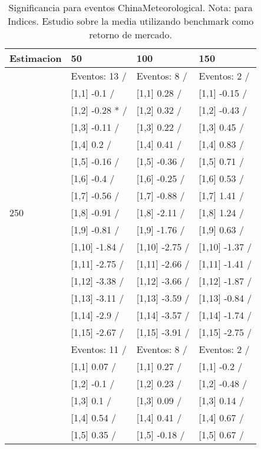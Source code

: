 \begin{table}

\caption{Significancia para eventos ChinaMeteorological. Nota: para Indices. Estudio sobre la media utilizando benchmark como retorno de mercado.}
\centering
\begin{tabular}[t]{llll}
\toprule
Estimacion & 50 & 100 & 150\\
\midrule
 & Eventos:  13 / & Eventos:  8 / & Eventos:  2 /\\
 & {}[1,1] -0.1  / & {}[1,1] 0.28  / & {}[1,1] -0.15  /\\
 & {}[1,2] -0.28 * / & {}[1,2] 0.32  / & {}[1,2] -0.43  /\\
 & {}[1,3] -0.11  / & {}[1,3] 0.22  / & {}[1,3] 0.45  /\\
 & {}[1,4] 0.2  / & {}[1,4] 0.41  / & {}[1,4] 0.83  /\\
\addlinespace
 & {}[1,5] -0.16  / & {}[1,5] -0.36  / & {}[1,5] 0.71  /\\
 & {}[1,6] -0.4  / & {}[1,6] -0.25  / & {}[1,6] 0.53  /\\
 & {}[1,7] -0.56  / & {}[1,7] -0.88  / & {}[1,7] 1.41  /\\
250 & {}[1,8] -0.91  / & {}[1,8] -2.11  / & {}[1,8] 1.24  /\\
 & {}[1,9] -0.81  / & {}[1,9] -1.76  / & {}[1,9] 0.63  /\\
\addlinespace
 & {}[1,10] -1.84  / & {}[1,10] -2.75  / & {}[1,10] -1.37  /\\
 & {}[1,11] -2.75  / & {}[1,11] -2.66  / & {}[1,11] -1.41  /\\
 & {}[1,12] -3.38  / & {}[1,12] -3.66  / & {}[1,12] -1.87  /\\
 & {}[1,13] -3.11  / & {}[1,13] -3.59  / & {}[1,13] -0.84  /\\
 & {}[1,14] -2.9  / & {}[1,14] -3.57  / & {}[1,14] -1.74  /\\
\addlinespace
 & {}[1,15] -2.67  / & {}[1,15] -3.91  / & {}[1,15] -2.75  /\\
 & Eventos:  11 / & Eventos:  8 / & Eventos:  2 /\\
 & {}[1,1] 0.07  / & {}[1,1] 0.27  / & {}[1,1] -0.2  /\\
 & {}[1,2] -0.1  / & {}[1,2] 0.23  / & {}[1,2] -0.48  /\\
 & {}[1,3] 0.1  / & {}[1,3] 0.09  / & {}[1,3] 0.14  /\\
\addlinespace
 & {}[1,4] 0.54  / & {}[1,4] 0.41  / & {}[1,4] 0.67  /\\
 & {}[1,5] 0.35  / & {}[1,5] -0.18  / & {}[1,5] 0.67  /\\

\end{tabular}
\end{table}
